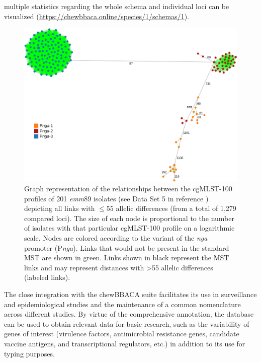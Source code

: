 multiple statistics regarding the whole schema and individual loci can be visualized (\url{https://chewbbaca.online/species/1/schemas/1}).

\begin{figure}[h!]
    \centering
    \includegraphics[width=\textwidth]{figures/chapter 4/Figure6.pdf}
    \caption{Graph representation of the relationships between the cgMLST-100 proﬁles of 201 \textit{emm}89 isolates (see Data Set 5 in reference \cite{friaes_supplemental_2023}) depicting all links with $\leq55$ allelic differences (from a total of 1,279 compared loci). The size of each node is proportional to the number of isolates with that particular cgMLST-100 proﬁle on a logarithmic scale. Nodes are colored according to the variant of the \textit{nga} promoter (P\textit{nga}). Links that would not be present in the standard \ac{MST} are shown in green. Links shown in black represent the \ac{MST} links and may represent distances with >55 allelic differences (labeled links).}
    \label{fig:chap4_figure6}
\end{figure}

The close integration with the chewBBACA suite \cite{silva_chewbbaca_2018} facilitates its use in surveillance and epidemiological studies and the maintenance of a common nomenclature across different studies. By virtue of the comprehensive annotation, the database can be used to obtain relevant data for basic research, such as the variability of genes of interest (virulence factors, antimicrobial resistance genes, candidate vaccine antigens, and transcriptional regulators, etc.) \cite{davies_atlas_2019, beres_integrative_2022} in addition to its use for typing purposes.

